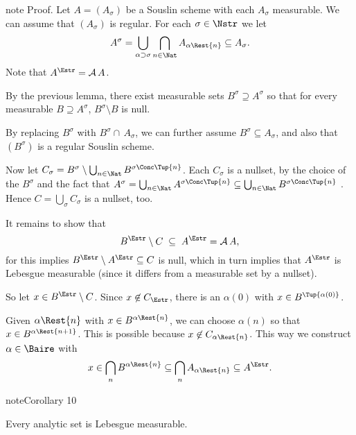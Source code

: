 \documentclass[letterpaper,10pt,english]{jupyterBook}
\begin{document}
\begin{sphinxadmonition}{note}
\sphinxAtStartPar
Proof. Let \( A = (A_\sigma)\) be a Souslin scheme with each \(A_\sigma\) measurable. We can assume that \((A_\sigma)\) is regular. For each \(\sigma \in \Nstr\) we let
\begin{equation*}
    A^\sigma = \bigcup_{\alpha \supset \sigma} \bigcap_{n \in \Nat} A_{\alpha\Rest{n}} \subseteq A_\sigma.
\end{equation*}
\sphinxAtStartPar
Note that \(A^\Estr = \mathcal{A}\, A\).

\sphinxAtStartPar
By the previous lemma, there exist measurable sets \(B^\sigma \supseteq A^\sigma\) so that for every measurable \(B \supseteq A^\sigma\), \(B^\sigma \setminus B\) is null.

\sphinxAtStartPar
By replacing \(B^\sigma\) with \(B^\sigma \cap \, A_\sigma\), we can further assume \(B^\sigma \subseteq A_\sigma\), and also that \((B^\sigma)\) is a regular Souslin scheme.

\sphinxAtStartPar
Now let \(C_\sigma = B^\sigma \setminus \bigcup_{n \in \Nat} B^{\sigma\Conc\Tup{n}}\). Each \(C_\sigma\) is a nullset, by the choice of the \(B^\sigma\) and the fact that  \(A^\sigma = \bigcup_{n \in \Nat} A^{\sigma\Conc\Tup{n}} \subseteq \bigcup_{n \in \Nat} B^{\sigma\Conc\Tup{n}}\) . Hence \(C= \bigcup_{\sigma} C_\sigma\) is a nullset, too.

\sphinxAtStartPar
It remains to show that
\begin{equation*}
B^\Estr \setminus C \; \subseteq \;  A^\Estr = \mathcal{A}\, A,
\end{equation*}
\sphinxAtStartPar
for this implies \(B^\Estr \setminus A^\Estr \subseteq C\) is null, which in turn implies that \(A^\Estr\) is Lebesgue measurable (since it differs from a measurable set by a nullset).

\sphinxAtStartPar
So let \(x \in B^\Estr \setminus C\). Since \(x \not \in C_\Estr\), there is an \(\alpha(0)\) with \(x \in B^{\Tup{\alpha(0)}}\).

\sphinxAtStartPar
Given \(\alpha\Rest{n}\) with \(x \in B^{\alpha\Rest{n}}\), we can choose \(\alpha(n)\) so that \(x \in B^{\alpha\Rest{n+1}}\). This is possible because \(x \not \in C_{\alpha\Rest{n}}\). This way we construct \(\alpha \in \Baire\) with
\begin{equation*}
x \in \bigcap_n B^{\alpha\Rest{n}} \subseteq  \bigcap_n A_{\alpha\Rest{n}} \subseteq A^\Estr.
\end{equation*}\end{sphinxadmonition}
\label{regularityAnalytic:cor-analytic-measurable}
\begin{sphinxadmonition}{note}{Corollary 10}



\sphinxAtStartPar
Every analytic set is Lebesgue measurable.
\end{sphinxadmonition}
\end{document}
